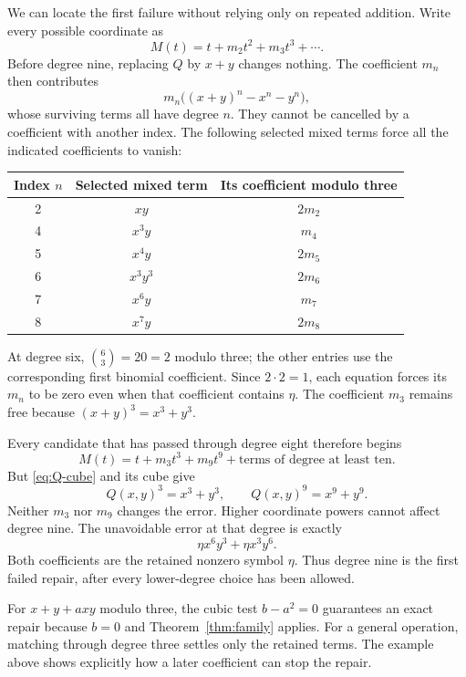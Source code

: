 We can locate the first failure without relying only on repeated addition. Write every possible coordinate as
\[
 M(t)=t+m_2t^2+m_3t^3+\cdots.
\]
Before degree nine, replacing \(Q\) by \(x+y\) changes nothing. The coefficient \(m_n\) then contributes
\[
 m_n\bigl((x+y)^n-x^n-y^n\bigr),
\]
whose surviving terms all have degree \(n\). They cannot be cancelled by a coefficient with another index. The following selected mixed terms force all the indicated coefficients to vanish:

\begin{center}
\begin{tabular}{ccc}
\toprule
Index \(n\)&Selected mixed term&Its coefficient modulo three\\
\midrule
2&\(xy\)&\(2m_2\)\\
4&\(x^3y\)&\(m_4\)\\
5&\(x^4y\)&\(2m_5\)\\
6&\(x^3y^3\)&\(2m_6\)\\
7&\(x^6y\)&\(m_7\)\\
8&\(x^7y\)&\(2m_8\)\\
\bottomrule
\end{tabular}
\end{center}
At degree six, \(\binom63=20=2\) modulo three; the other entries use the corresponding first binomial coefficient. Since \(2\cdot2=1\), each equation forces its \(m_n\) to be zero even when that coefficient contains \(\eta\). The coefficient \(m_3\) remains free because \((x+y)^3=x^3+y^3\).

Every candidate that has passed through degree eight therefore begins
\[
 M(t)=t+m_3t^3+m_9t^9+\text{terms of degree at least ten}.
\]
But \eqref{eq:Q-cube} and its cube give
\[
 Q(x,y)^3=x^3+y^3,\qquad Q(x,y)^9=x^9+y^9.
\]
Neither \(m_3\) nor \(m_9\) changes the error. Higher coordinate powers cannot affect degree nine. The unavoidable error at that degree is exactly
\[
 \eta x^6y^3+\eta x^3y^6.
\]
Both coefficients are the retained nonzero symbol \(\eta\). Thus degree nine is the first failed repair, after every lower-degree choice has been allowed.

For \(x+y+a xy\) modulo three, the cubic test \(b-a^2=0\) guarantees an exact repair because \(b=0\) and Theorem~\ref{thm:family} applies. For a general operation, matching through degree three settles only the retained terms. The example above shows explicitly how a later coefficient can stop the repair.
